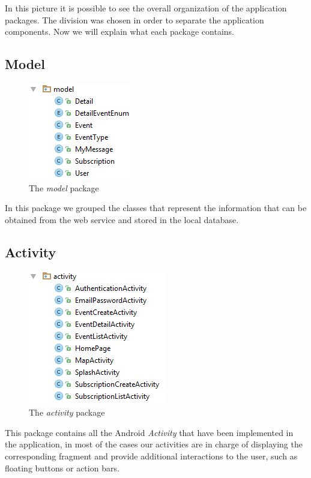 \documentclass[a4paper]{scrreprt}
\begin{document}
In this picture it is possible to see the overall organization of the application packages. The division was chosen in order to separate the application components. Now we will explain what each package contains.

\subsection{Model}
\begin{figure}[H]
	\centering
	\includegraphics{imgs/pack_model}
	\caption{The \emph{model} package}
\end{figure}
In this package we grouped the classes that represent the information that can be obtained from the web service and stored in the local database.

\subsection{Activity}
\begin{figure}[H]
	\centering
	\includegraphics{imgs/pack_activity}
	\caption{The \emph{activity} package}
\end{figure}
This package contains all the Android \emph{Activity} that have been implemented in the application, in most of the cases our activities are in charge of displaying the corresponding fragment and provide additional interactions to the user, such as floating buttons or action bars.
\end{document}
